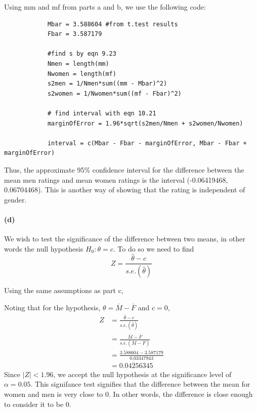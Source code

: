 \documentclass[fleqn]{article}
\begin{document}
		Using mm and mf from parts a and b, we use the following code: 
		\begin{verbatim}
			Mbar = 3.588604	#from t.test results
			Fbar = 3.587179

			#find s by eqn 9.23
			Nmen = length(mm)
			Nwomen = length(mf)
			s2men = 1/Nmen*sum((mm - Mbar)^2)
			s2women = 1/Nwomen*sum((mf - Fbar)^2)

			# find interval with eqn 10.21
			marginOfError = 1.96*sqrt(s2men/Nmen + s2women/Nwomen)
			
			interval = c(Mbar - Fbar - marginOfError, Mbar - Fbar + marginOfError)
		\end{verbatim}
		Thus, the approximate 95\% confidence interval for the difference between the mean men ratings and mean women ratings is the interval (-0.06419468,  0.06704468). This is another way of showing that the rating is independent of gender.
	
	\paragraph{(d)}
		We wish to test the significance of the difference between two means, in other words the null hypothesis \(H_0 : \theta = c\). To do so we need to find  
		\[Z = \frac{\hat{\theta} - c}{s.e.(\hat{\theta})} \tag{11.6}\]
		
		Using the same assumptions as part c,
		
		
		Noting that for the hypothesis, \(\theta = \overline{M} - \overline{F}\) and \(c = 0\), 
		\begin{align*}
		Z &= \frac{\hat{\theta} - c}{s.e.(\hat{\theta})}\\
		  &= \frac{\overline{M} - \overline{F}}{s.e.(\overline{M} - \overline{F})}\\
		  &= \frac{3.588604 - 3.587179}{0.03347943}\\
		  &= 0.04256345
		\end{align*}
		Since \(|Z| < 1.96\), we accept the null hypothesis at the significance level of \(\alpha = 0.05\). This signifance test signifies that the difference between the mean for women and men is very close to 0. In other words, the difference is close enough to consider it to be 0.
\end{document}
